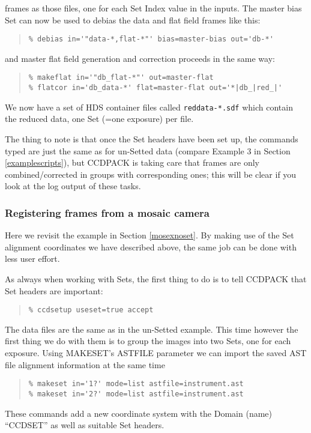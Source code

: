 \documentclass[twoside,11pt]{article}
\newcommand{\htmlref}[2]{#1}
\newcommand{\latexhtml}[2]{#1}
\renewcommand{\_}{\texttt{\symbol{95}}}
\newcommand{\ttsize}{\latexhtml{\small}{}}
\newenvironment{myquote}{\begin{quote}\ttsize}{\end{quote}}
\newcommand{\text}[1]{{\ttsize \tt #1}}
\newcommand{\xroutine}[1]{\htmlref{{\sc #1}}{#1}}
\begin{document}
frames as those files, one for each Set Index value in the inputs.
The master bias Set can now be used to debias the data and flat field
frames like this:
\begin{myquote}
\begin{verbatim}
% debias in='"data-*,flat-*"' bias=master-bias out='db-*'
\end{verbatim}
\end{myquote}
and master flat field generation and correction proceeds in the same way:
\begin{myquote}
\begin{verbatim}
% makeflat in='"db_flat-*"' out=master-flat
% flatcor in='db_data-*' flat=master-flat out='*|db_|red_|'
\end{verbatim}
\end{myquote}
We now have a set of HDS container files called \text{red\_data-*.sdf}
which contain the reduced data, one Set (=one exposure) per file.

The thing to note is that once the Set headers have been set up,
the commands typed are just the same as for un-Setted data
(compare Example 3 in Section \ref{examplescripts}),
but CCDPACK is taking care that frames are only combined/corrected
in groups with corresponding ones; this will be clear if you 
look at the log output of these tasks.

\subsubsection{\label{mosexset}Registering frames from a mosaic camera}

Here we revisit the example in Section \ref{mosexnoset}.
By making use of the Set alignment coordinates we have described above,
the same job can be done with less user effort.

As always when working with Sets, the first thing to do is to
tell CCDPACK that Set headers are important:
\begin{myquote}
\begin{verbatim}
% ccdsetup useset=true accept
\end{verbatim}
\end{myquote}

The data files are the same as in the un-Setted example.
This time however the first thing we do with them is to group the 
images into two Sets, one for each exposure.  Using \xroutine{MAKESET}'s
ASTFILE parameter we can import the saved AST file alignment information
at the same time
\begin{myquote}
\begin{verbatim}
% makeset in='1?' mode=list astfile=instrument.ast
% makeset in='2?' mode=list astfile=instrument.ast
\end{verbatim}
\end{myquote}
These commands add a new coordinate system with the Domain (name)
``CCD\_SET'' as well as suitable Set headers.
\end{document}
